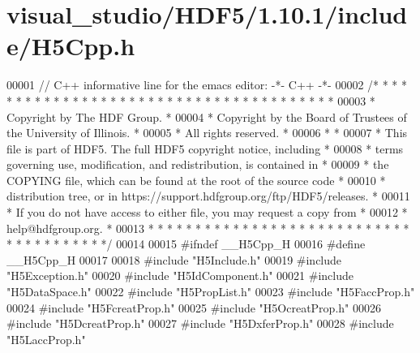 \hypertarget{visual__studio_2_h_d_f5_21_810_81_2include_2_h5_cpp_8h_source}{}\section{visual\+\_\+studio/\+H\+D\+F5/1.10.1/include/\+H5\+Cpp.h}
\label{visual__studio_2_h_d_f5_21_810_81_2include_2_h5_cpp_8h_source}

\begin{DoxyCode}
00001 \textcolor{comment}{// C++ informative line for the emacs editor: -*- C++ -*-}
00002 \textcolor{comment}{/* * * * * * * * * * * * * * * * * * * * * * * * * * * * * * * * * * * * * * *}
00003 \textcolor{comment}{ * Copyright by The HDF Group.                                               *}
00004 \textcolor{comment}{ * Copyright by the Board of Trustees of the University of Illinois.         *}
00005 \textcolor{comment}{ * All rights reserved.                                                      *}
00006 \textcolor{comment}{ *                                                                           *}
00007 \textcolor{comment}{ * This file is part of HDF5.  The full HDF5 copyright notice, including     *}
00008 \textcolor{comment}{ * terms governing use, modification, and redistribution, is contained in    *}
00009 \textcolor{comment}{ * the COPYING file, which can be found at the root of the source code       *}
00010 \textcolor{comment}{ * distribution tree, or in https://support.hdfgroup.org/ftp/HDF5/releases.  *}
00011 \textcolor{comment}{ * If you do not have access to either file, you may request a copy from     *}
00012 \textcolor{comment}{ * help@hdfgroup.org.                                                        *}
00013 \textcolor{comment}{ * * * * * * * * * * * * * * * * * * * * * * * * * * * * * * * * * * * * * * */}
00014 
00015 \textcolor{preprocessor}{#ifndef \_\_H5Cpp\_H}
00016 \textcolor{preprocessor}{#define \_\_H5Cpp\_H}
00017 
00018 \textcolor{preprocessor}{#include "H5Include.h"}
00019 \textcolor{preprocessor}{#include "H5Exception.h"}
00020 \textcolor{preprocessor}{#include "H5IdComponent.h"}
00021 \textcolor{preprocessor}{#include "H5DataSpace.h"}
00022 \textcolor{preprocessor}{#include "H5PropList.h"}
00023 \textcolor{preprocessor}{#include "H5FaccProp.h"}
00024 \textcolor{preprocessor}{#include "H5FcreatProp.h"}
00025 \textcolor{preprocessor}{#include "H5OcreatProp.h"}
00026 \textcolor{preprocessor}{#include "H5DcreatProp.h"}
00027 \textcolor{preprocessor}{#include "H5DxferProp.h"}
00028 \textcolor{preprocessor}{#include "H5LaccProp.h"}

\end{DoxyCode}
